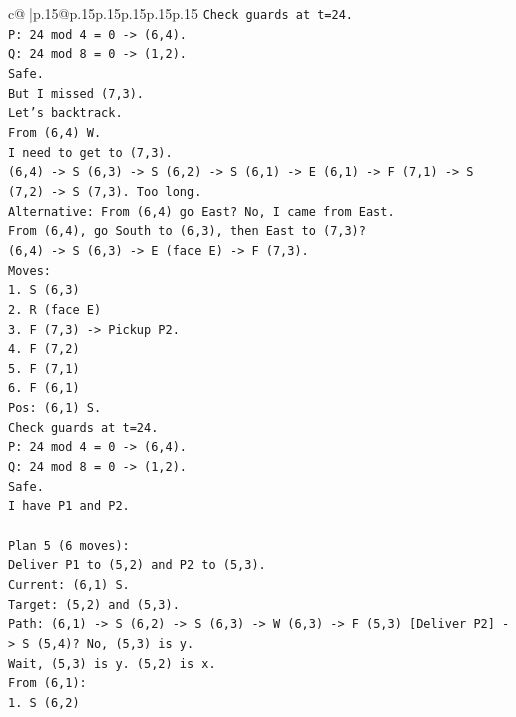 \documentclass{article}
\begin{document}
{\begin{supertabular}{c@{$\;$}|p{.15\linewidth}@{}p{.15\linewidth}p{.15\linewidth}p{.15\linewidth}p{.15\linewidth}p{.15\linewidth}}
{{{\texttt{Check guards at t=24.} \\
\texttt{P: 24 mod 4 = 0 {-}> (6,4).} \\
\texttt{Q: 24 mod 8 = 0 {-}> (1,2).} \\
\texttt{Safe.} \\
\texttt{But I missed (7,3).} \\
\texttt{Let's backtrack.} \\
\texttt{From (6,4) W.} \\
\texttt{I need to get to (7,3).} \\
\texttt{(6,4) {-}> S (6,3) {-}> S (6,2) {-}> S (6,1) {-}> E (6,1) {-}> F (7,1) {-}> S (7,2) {-}> S (7,3). Too long.} \\
\texttt{Alternative: From (6,4) go East? No, I came from East.} \\
\texttt{From (6,4), go South to (6,3), then East to (7,3)?} \\
\texttt{(6,4) {-}> S (6,3) {-}> E (face E) {-}> F (7,3).} \\
\texttt{Moves:} \\
\texttt{1. S (6,3)} \\
\texttt{2. R (face E)} \\
\texttt{3. F (7,3) {-}> Pickup P2.} \\
\texttt{4. F (7,2)} \\
\texttt{5. F (7,1)} \\
\texttt{6. F (6,1)} \\
\texttt{Pos: (6,1) S.} \\
\texttt{Check guards at t=24.} \\
\texttt{P: 24 mod 4 = 0 {-}> (6,4).} \\
\texttt{Q: 24 mod 8 = 0 {-}> (1,2).} \\
\texttt{Safe.} \\
\texttt{I have P1 and P2.} \\
\\ 
\texttt{Plan 5 (6 moves):} \\
\texttt{Deliver P1 to (5,2) and P2 to (5,3).} \\
\texttt{Current: (6,1) S.} \\
\texttt{Target: (5,2) and (5,3).} \\
\texttt{Path: (6,1) {-}> S (6,2) {-}> S (6,3) {-}> W (6,3) {-}> F (5,3) {[}Deliver P2{]} {-}> S (5,4)? No, (5,3) is y.} \\
\texttt{Wait, (5,3) is y. (5,2) is x.} \\
\texttt{From (6,1):} \\
\texttt{1. S (6,2)} \\
}}}
\end{supertabular}}
\end{document}
